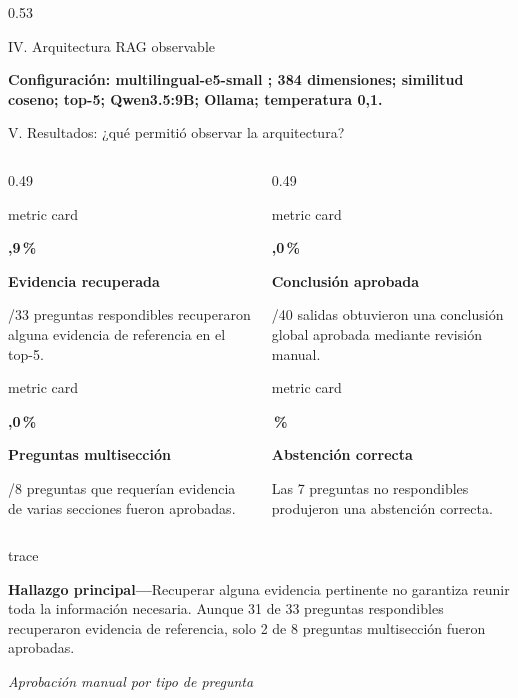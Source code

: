 \documentclass[final]{beamer}
\newcommand{\resultcard}[3]{%
  \begin{beamercolorbox}[wd=\linewidth,sep=0.50cm]{metric card}
    {\color{Teal}\bfseries\fontsize{46}{50}\selectfont #1\par}
    \vspace{0.12cm}
    {\bfseries\fontsize{25}{29}\selectfont #2\par}
    \vspace{0.12cm}
    {\fontsize{20}{24}\selectfont #3\par}
  \end{beamercolorbox}
}
\begin{document}
\begin{frame}[t]
\begin{columns}[T,totalwidth=\textwidth]
\begin{column}{0.53\textwidth}
\begin{block}{IV. Arquitectura RAG observable}
\vspace{0.20cm}
{\fontsize{21}{25}\selectfont\bfseries
Configuración: multilingual-e5-small \cite{wang2024e5}; 384 dimensiones;
similitud coseno; top-5; Qwen3.5:9B; Ollama; temperatura 0,1.\par}
\end{block}

\begin{block}{V. Resultados: ¿qué permitió observar la arquitectura?}
\begin{columns}[T,totalwidth=\linewidth]
  \begin{column}{0.49\linewidth}
    \resultcard{93,9\,\%}{Evidencia recuperada}{31/33 preguntas respondibles
    recuperaron alguna evidencia de referencia en el top-5.}
    \vspace{0.25cm}
    \resultcard{25,0\,\%}{Preguntas multisección}{2/8 preguntas que requerían
    evidencia de varias secciones fueron aprobadas.}
  \end{column}
  \begin{column}{0.49\linewidth}
    \resultcard{70,0\,\%}{Conclusión aprobada}{28/40 salidas obtuvieron una
    conclusión global aprobada mediante revisión manual.}
    \vspace{0.25cm}
    \resultcard{100\,\%}{Abstención correcta}{Las 7 preguntas no respondibles
    produjeron una abstención correcta.}
  \end{column}
\end{columns}

\vspace{0.30cm}
\begin{beamercolorbox}[wd=\linewidth,sep=0.34cm]{trace}
  {\fontsize{24}{29}\selectfont
  \textbf{Hallazgo principal---}Recuperar alguna evidencia pertinente no
  garantiza reunir toda la información necesaria. Aunque 31 de 33 preguntas
  respondibles recuperaron evidencia de referencia, solo 2 de 8 preguntas
  multisección fueron aprobadas.\par}
\end{beamercolorbox}

\vspace{0.65cm}
\centering
{\fontsize{23}{28}\selectfont\textit{Aprobación manual por tipo de pregunta}\par}
\vspace{0.25cm}
\begin{minipage}{0.96\linewidth}
\centering
{}
\end{minipage}
\end{block}
\end{column}
\end{columns}
\end{frame}
\end{document}
